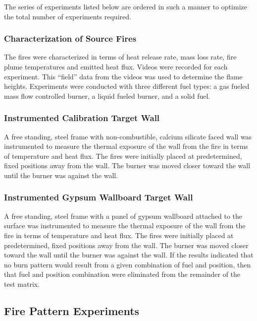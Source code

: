 \documentclass[twoside]{uocthesis}
\begin{document}
The series of experiments listed below are ordered in such a manner to optimize the total number of experiments required.

\subsubsection{Characterization of Source Fires}

The fires were characterized in terms of heat release rate, mass loss rate, fire plume temperatures and emitted heat flux. Videos were recorded for each experiment.  This ``field'' data from the videos was  used to determine the flame heights. Experiments were conducted with three different fuel types: a gas fueled mass flow controlled burner, a liquid fueled burner, and a solid fuel.

\subsubsection{Instrumented Calibration Target Wall}

A free standing, steel frame with non-combustible, calcium silicate faced wall was instrumented to measure the thermal exposure of the wall from the fire in terms of temperature and heat flux.  The fires were initially placed at predetermined, fixed positions away from the wall. The burner was moved closer toward the wall until the burner was against the wall.

\subsubsection{Instrumented Gypsum Wallboard Target Wall}

A free standing, steel frame with a panel of gypsum wallboard attached to the surface was instrumented to measure the thermal exposure of the wall from the fire in terms of temperature and heat flux.  The fires were initially placed at predetermined, fixed positions away from the wall. The burner was moved closer toward the wall until the burner was against the wall.  If the results indicated that no burn pattern would result from a given combination of fuel and position, then that fuel and position combination were eliminated from the remainder of the test matrix.

\subsection{Fire Pattern Experiments}
\end{document}

